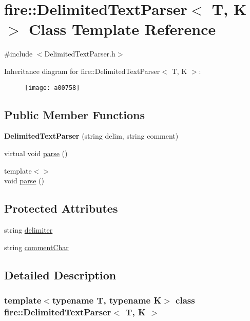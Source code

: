 \hypertarget{a00758}{}\section{fire\+:\+:Delimited\+Text\+Parser$<$ T, K $>$ Class Template Reference}
\label{a00758}


{\ttfamily \#include $<$Delimited\+Text\+Parser.\+h$>$}

Inheritance diagram for fire\+:\+:Delimited\+Text\+Parser$<$ T, K $>$\+:\begin{figure}[H]
\begin{center}
\leavevmode
\texttt{[image: a00758]}
\end{center}
\end{figure}
\subsection*{Public Member Functions}
\begin{DoxyCompactItemize}
\item 
\mbox{\label{a00758_aa1f041ebbf0bf72145e8bd20bf95f3f4}} 
{\bfseries Delimited\+Text\+Parser} (string delim, string comment)
\item 
virtual void \hyperlink{a00758_a686df5548771cae833d5e721442a821a}{parse} ()
\item 
{\footnotesize template$<$$>$ }\\void \hyperlink{a00758_a773fa7ed28cb9d8c384ad94bd81fc93f}{parse} ()
\end{DoxyCompactItemize}
\subsection*{Protected Attributes}
\begin{DoxyCompactItemize}
\item 
string \hyperlink{a00758_ac817fc333b53611a41f446977461bdbf}{delimiter}
\item 
string \hyperlink{a00758_acdd7b27b8109ed41e7d9bc5e6de72e93}{comment\+Char}
\end{DoxyCompactItemize}


\subsection{Detailed Description}
\subsubsection*{template$<$typename T, typename K$>$\newline
class fire\+::\+Delimited\+Text\+Parser$<$ T, K $>$}

